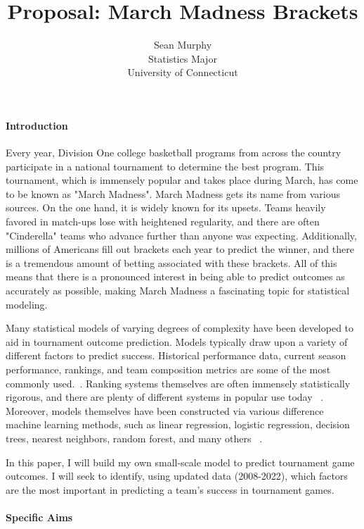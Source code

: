 \documentclass[12pt]{article}
\title{Proposal: March Madness Brackets}
\author{Sean Murphy\\
  Statistics Major\\
  University of Connecticut
}
\begin{document}
\maketitle


\paragraph{Introduction}

Every year, Division One college basketball programs from across the country 
participate in a national tournament to determine the best program.  This  
tournament, which is immensely popular and takes place during March, has 
come to be known as "March Madness".  March Madness gets its name from various 
sources.  On the one hand, it is widely known for its upsets.  Teams heavily 
favored in match-ups lose with heightened regularity, and there are often 
"Cinderella" teams who advance further than anyone was expecting.  
Additionally, millions of Americans fill out brackets each year to predict 
the winner, and there is a tremendous amount of betting associated with 
these brackets.  All of this means that there is a pronounced interest in 
being able to predict outcomes as accurately as possible, making March 
Madness a fascinating topic for statistical modeling.  

Many statistical models of varying degrees of complexity have been developed 
to aid in tournament outcome prediction.  Models typically draw upon a variety 
of different factors to predict success.  Historical performance data, current 
season performance, rankings, and team composition metrics are some of the 
most commonly used.~\citep{toutkoushian2011predicting}.  Ranking systems 
themselves are often immensely statistically rigorous, and there are plenty of 
different systems in popular use today ~\citep{steinberg2018march}.  Moreover, 
models themselves have been constructed via various difference machine learning 
methods, such as linear regression, logistic regression, decision trees, 
nearest neighbors, random forest, and many others ~\citep{fonseca2018march}.

In this paper, I will build my own small-scale model to predict tournament game 
outcomes.  I will seek to identify, using updated data (2008-2022), which 
factors are the most important in predicting a team's success in tournament games.

\paragraph{Specific Aims}
\end{document}
